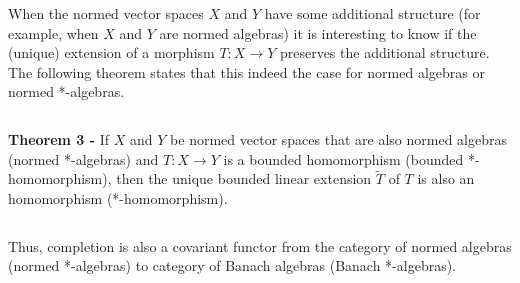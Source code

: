 \documentclass[12pt]{article}
\begin{document}
When the normed vector spaces $X$ and $Y$ have some additional structure (for example, when $X$ and $Y$ are normed algebras) it is interesting to know if the (unique) extension of a morphism $T:X \longrightarrow Y$ preserves the additional structure. The following theorem states that this indeed the case for normed algebras or normed *-algebras.

$\,$

{\bf Theorem 3 -} If $X$ and $Y$ be normed vector spaces that are also normed algebras (normed *-algebras) and $T:X \longrightarrow Y$ is a bounded homomorphism (bounded *-homomorphism), then the unique bounded linear extension $\widetilde{T}$ of $T$ is also an homomorphism (*-homomorphism).

$\,$

Thus, completion is also a covariant functor from the category of normed algebras (normed *-algebras) to category of Banach algebras (Banach *-algebras).
\end{document}
